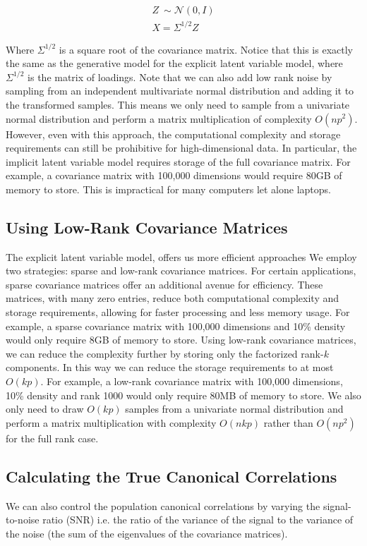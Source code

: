 \begin{align}
    Z~\sim \mathcal{N}(0, I) \\
    X = \Sigma^{1/2}Z
\end{align}

Where \( \Sigma^{1/2} \) is a square root of the covariance matrix.
Notice that this is exactly the same as the generative model for the explicit latent variable model, where \( \Sigma^{1/2} \) is the matrix of loadings.
Note that we can also add low rank noise by sampling from an independent multivariate normal distribution and adding it to the transformed samples.
This means we only need to sample from a univariate normal distribution and perform a matrix multiplication of complexity \(O(np^2)\).
However, even with this approach, the computational complexity and storage requirements can still be prohibitive for high-dimensional data.
In particular, the implicit latent variable model requires storage of the full covariance matrix.
For example, a covariance matrix with 100,000 dimensions would require 80GB of memory to store.
This is impractical for many computers let alone laptops.

\subsection{Using Low-Rank Covariance Matrices}
The explicit latent variable model, offers us more efficient approaches
We employ two strategies: sparse and low-rank covariance matrices.
For certain applications, sparse covariance matrices offer an additional avenue for efficiency.
These matrices, with many zero entries, reduce both computational complexity and storage requirements, allowing for faster processing and less memory usage.
For example, a sparse covariance matrix with 100,000 dimensions and 10\% density would only require 8GB of memory to store.
Using low-rank covariance matrices, we can reduce the complexity further by storing only the factorized rank-$k$ components.
In this way we can reduce the storage requirements to at most \(O(kp)\).
For example, a low-rank covariance matrix with 100,000 dimensions, 10\% density and rank 1000 would only require 80MB of memory to store.
We also only need to draw \(O(kp)\) samples from a univariate normal distribution and perform a matrix multiplication with complexity \(O(nkp)\) rather than \(O(np^2)\) for the full rank case.

\subsection{Calculating the True Canonical Correlations}
We can also control the population canonical correlations by varying the signal-to-noise ratio (SNR) i.e. the ratio of the variance of the signal to the variance of the noise (the sum of the eigenvalues of the covariance matrices).

